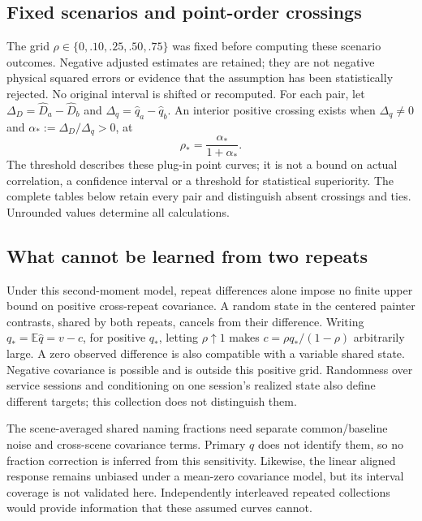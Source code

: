 \subsection{Fixed scenarios and point-order crossings}
The grid $\rho\in\{0,.10,.25,.50,.75\}$ was fixed before computing these
scenario outcomes. Negative adjusted estimates are retained; they are not
negative physical squared errors or evidence that the assumption has been
statistically rejected. No original interval is shifted or recomputed.
For each pair, let $\Delta_D=\widehat D_a-\widehat D_b$ and
$\Delta_q=\widehat q_a-\widehat q_b$. An interior positive crossing exists
when $\Delta_q\ne0$ and $\alpha_*:=\Delta_D/\Delta_q>0$, at
\begin{equation}
 \rho_* = \frac{\alpha_*}{1+\alpha_*}.
\end{equation}
The threshold describes these plug-in point curves; it is not a bound on actual
correlation, a confidence interval or a threshold for statistical superiority.
The complete tables below retain every pair and distinguish absent crossings
and ties. Unrounded values determine all calculations.

\subsection{What cannot be learned from two repeats}
Under this second-moment model, repeat differences alone impose no finite
upper bound on positive cross-repeat covariance. A random state in the centered
painter contrasts, shared by both repeats, cancels from their difference. Writing $q_*=\mathbb E\widehat q=v-c$,
for positive $q_*$, letting $\rho\uparrow1$ makes
$c=\rho q_* /(1-\rho)$ arbitrarily large. A zero observed
difference is also compatible with a variable shared state. Negative covariance
is possible and is outside this positive grid. Randomness over service sessions
and conditioning on one session's realized state also define different targets;
this collection does not distinguish them.

The scene-averaged shared naming fractions need separate common/baseline noise
and cross-scene covariance terms. Primary $q$ does not identify them, so no
fraction correction is inferred from this sensitivity. Likewise, the linear
aligned response remains unbiased under a mean-zero covariance model, but its
interval coverage is not validated here. Independently interleaved repeated
collections would provide information that these assumed curves cannot.
